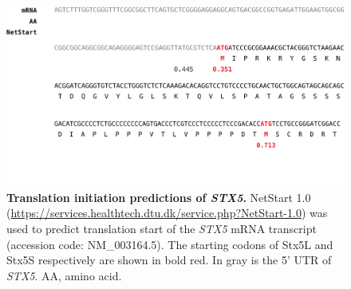 \begin{figure}
    \includegraphics[keepaspectratio=true,width=\textwidth,height=\textheight]{chapters/chapter6/chapter6_SupplementaryFigure18.pdf}
    \caption{\textbf{Translation initiation predictions of \emph{STX5}.} NetStart 1.0\cite{pedersen_neural_1997} (\url{https://services.healthtech.dtu.dk/service.php?NetStart-1.0}) was used to predict translation start of the \emph{STX5} mRNA transcript (accession code: NM\_003164.5). The starting codons of Stx5L and Stx5S respectively are shown in bold red. In gray is the 5’ UTR of \emph{STX5}. AA, amino acid.}
    \label{fig:ch6supfig18}
\end{figure}

\clearpage

